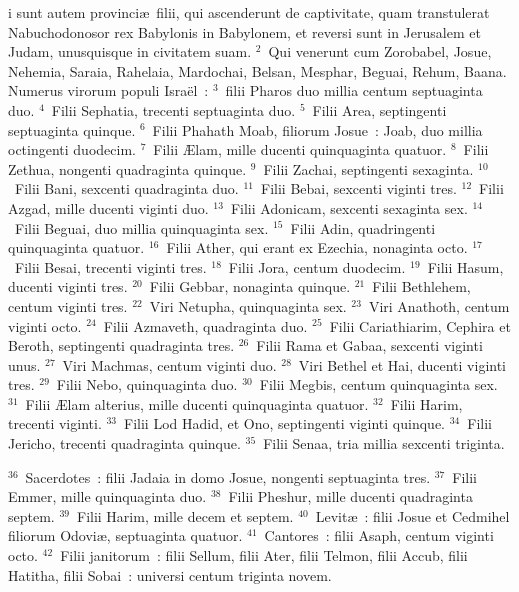 \bchapter
{}i sunt autem provinci\ae\ filii, qui ascenderunt de captivitate, quam transtulerat Nabuchodonosor rex Babylonis in Babylonem, et reversi sunt in Jerusalem et Judam, unusquisque in civitatem suam.
${}^{2}$~Qui venerunt cum Zorobabel, Josue, Nehemia, Saraia, Rahelaia, Mardochai, Belsan, Mesphar, Beguai, Rehum, Baana. Numerus virorum populi Isra\"el~:
${}^{3}$~filii Pharos duo millia centum septuaginta duo.
${}^{4}$~Filii Sephatia, trecenti septuaginta duo.
${}^{5}$~Filii Area, septingenti septuaginta quinque.
${}^{6}$~Filii Phahath Moab, filiorum Josue~: Joab, duo millia octingenti duodecim.
${}^{7}$~Filii \AE lam, mille ducenti quinquaginta quatuor.
${}^{8}$~Filii Zethua, nongenti quadraginta quinque.
${}^{9}$~Filii Zachai, septingenti sexaginta.
${}^{10}$~Filii Bani, sexcenti quadraginta duo.
${}^{11}$~Filii Bebai, sexcenti viginti tres.
${}^{12}$~Filii Azgad, mille ducenti viginti duo.
${}^{13}$~Filii Adonicam, sexcenti sexaginta sex.
${}^{14}$~Filii Beguai, duo millia quinquaginta sex.
${}^{15}$~Filii Adin, quadringenti quinquaginta quatuor.
${}^{16}$~Filii Ather, qui erant ex Ezechia, nonaginta octo.
${}^{17}$~Filii Besai, trecenti viginti tres.
${}^{18}$~Filii Jora, centum duodecim.
${}^{19}$~Filii Hasum, ducenti viginti tres.
${}^{20}$~Filii Gebbar, nonaginta quinque.
${}^{21}$~Filii Bethlehem, centum viginti tres.
${}^{22}$~Viri Netupha, quinquaginta sex.
${}^{23}$~Viri Anathoth, centum viginti octo.
${}^{24}$~Filii Azmaveth, quadraginta duo.
${}^{25}$~Filii Cariathiarim, Cephira et Beroth, septingenti quadraginta tres.
${}^{26}$~Filii Rama et Gabaa, sexcenti viginti unus.
${}^{27}$~Viri Machmas, centum viginti duo.
${}^{28}$~Viri Bethel et Hai, ducenti viginti tres.
${}^{29}$~Filii Nebo, quinquaginta duo.
${}^{30}$~Filii Megbis, centum quinquaginta sex.
${}^{31}$~Filii \AE lam alterius, mille ducenti quinquaginta quatuor.
${}^{32}$~Filii Harim, trecenti viginti.
${}^{33}$~Filii Lod Hadid, et Ono, septingenti viginti quinque.
${}^{34}$~Filii Jericho, trecenti quadraginta quinque.
${}^{35}$~Filii Senaa, tria millia sexcenti triginta.


${}^{36}$~Sacerdotes~: filii Jadaia in domo Josue, nongenti septuaginta tres.
${}^{37}$~Filii Emmer, mille quinquaginta duo.
${}^{38}$~Filii Pheshur, mille ducenti quadraginta septem.
${}^{39}$~Filii Harim, mille decem et septem.
${}^{40}$~Levit\ae~: filii Josue et Cedmihel filiorum Odovi\ae , septuaginta quatuor.
${}^{41}$~Cantores~: filii Asaph, centum viginti octo.
${}^{42}$~Filii janitorum~: filii Sellum, filii Ater, filii Telmon, filii Accub, filii Hatitha, filii Sobai~: universi centum triginta novem.


